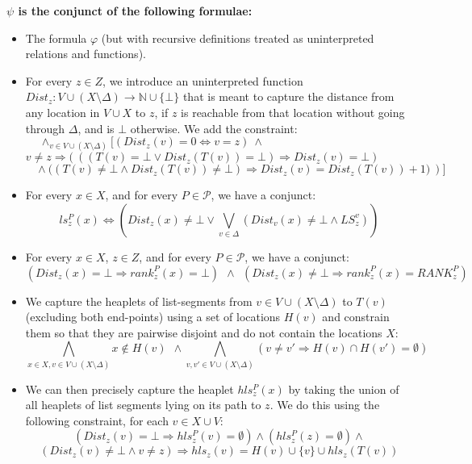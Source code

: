 \medskip
\noindent 
{\bf $\psi$ is the conjunct of the following formulae:}
\begin{itemize}
	\item The formula $\varphi$ (but with recursive definitions treated as uninterpreted relations and functions).
	\item For every $z \in Z$, we introduce an uninterpreted function $Dist_z: V \cup (X \setminus \Delta) \longrightarrow \mathbb{N} \cup \{\bot\}$ that
             is meant to capture the distance from any location in $V \cup X$ to $z$, if $z$ is reachable from
               that location without going through $\Delta$, and is $\bot$ otherwise. We add the constraint:
          $$\wedge_{v \in V\cup (X\setminus \Delta)} \big[ (Dist_z(v)\!=\!0 \Leftrightarrow v=z) ~\wedge ~~~~~~~~~~~~~~~~~~~~~~~~~~~~~~~~~~~~~~~~~~~~~~~~~~~~~~$$
          $$ v \!\not =\! z \Rightarrow \big(~\left( (T(v)\!=\!\bot \vee Dist_z(T(v))\!=\!\bot) \Rightarrow Dist_z(v) \!=\! \bot
                 \right)~~~~~~~~~~~~~~~$$
          $$  ~~~~~  \left. \wedge ~((T(v) \not = \bot \wedge Dist_z(T(v)) \not = \bot) \Rightarrow Dist_z(v) = Dist_z(T(v))+1
                \big) ~\right)\big] $$
              
	\item For every $x \in X$, and for every $P \in \mathcal{P}$, we have a conjunct:
		     $$ls_z^P(x) \Leftrightarrow (Dist_z(x)\not= \bot \vee \bigvee_{v \in \Delta} (Dist_v(x) \not = \bot
		       \wedge LS_z^v))$$
		     
    \item For every $x \in X$, $z \in Z$, and for every $P \in \mathcal{P}$, we have a conjunct:
             $$ \left( Dist_z(x) \!=\! \bot \Rightarrow rank_z^P\!(x)\!=\!\bot\right) ~~\wedge~~ 
               \left( Dist_z(x) \!\not =\! \bot \Rightarrow rank_z^P\!(x)\!=\!RANK_z^P \right)$$
               
    \item We capture the heaplets of list-segments from $v \in V \cup (X \setminus \Delta)$ to $T(v)$ (excluding both
              end-points) using a set
             of locations $H(v)$
             and constrain them so that they are pairwise disjoint and do not contain the locations $X$:
             $$ \bigwedge_{x \in X, v \in V \cup (X \setminus \Delta)} x \not \in H(v) ~~\wedge 
             \bigwedge_{v,v' \in V \cup (X \setminus \Delta)} (v \!\not =\! v' \Rightarrow H(v) \cap H(v') = \emptyset)$$  
    
    \item We can then precisely capture the heaplet $hls_z^P(x)$ by taking the union of all heaplets of
           list segments lying on its path to $z$. We do this using the following constraint, for each
           $v \in X \cup V$:
           $$(Dist_z(v)=\bot \Rightarrow hls_z^P (v) = \emptyset) \wedge (hls_z^P(z)= \emptyset)\wedge $$
           $$(Dist_z(v) \not = \bot \wedge v \not = z) \Rightarrow hls_z(v)= H(v) \cup \{v\} \cup hls_z(T(v))$$

\end{itemize}

